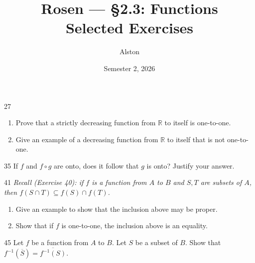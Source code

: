 \documentclass[11pt]{article}
\title{Rosen --- \S 2.3: Functions\\ \large Selected Exercises}
\author{Alston}
\date{Semester 2, 2026}
\begin{document}
\maketitle

\begin{exercise}{27}
    \begin{enumerate}[label=(\alph*)]
        \item Prove that a strictly decreasing function from $\mathbb{R}$
        to itself is one-to-one.
        \item Give an example of a decreasing function from $\mathbb{R}$
        to itself that is not one-to-one.
    \end{enumerate}
\end{exercise}

\begin{exercise}{35}
    If $f$ and $f \circ g$ are onto, does it follow that $g$ is onto?
    Justify your answer.
\end{exercise}

\begin{exercise}{41}
    \textit{Recall (Exercise 40): if $f$ is a function from $A$ to $B$
    and $S, T$ are subsets of $A$, then
    $f(S \cap T) \subseteq f(S) \cap f(T)$.}
    \begin{enumerate}[label=(\alph*)]
        \item Give an example to show that the inclusion above may be
        proper.
        \item Show that if $f$ is one-to-one, the inclusion above is an
        equality.
    \end{enumerate}
\end{exercise}

\begin{exercise}{45}
    Let $f$ be a function from $A$ to $B$. Let $S$ be a subset of $B$.
    Show that $f^{-1}(\overline{S}) = \overline{f^{-1}(S)}$.
\end{exercise}
\end{document}
